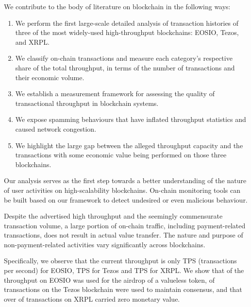 We contribute to the body of literature on blockchain in the following ways:  
\begin{enumerate}%
\item We perform the first large-scale detailed analysis of transaction histories of three of the most widely-used high-throughput blockchains: EOSIO, Tezos, and XRPL.

\item We classify on-chain transactions and measure each category's respective share of the total throughput, in terms of the number of transactions and their economic volume.

\item We establish a measurement framework for assessing the quality of transactional throughput in blockchain systems.

\item We expose spamming behaviours that have inflated throughput statistics and caused network congestion.

\item We highlight the large gap between the alleged throughput capacity and the transactions with some economic value being performed on those three blockchains.
\end{enumerate}
%
Our analysis serves as the first step towards a better understanding of the nature of user activities on high-scalability blockchains. On-chain monitoring tools can be built based on our framework to detect undesired or even malicious behaviour.

Despite the advertised high throughput and the seemingly commensurate transaction volume, a large portion of on-chain traffic, including payment-related transactions, does not result in actual value transfer. 
The nature and purpose of non-payment-related activities vary significantly across blockchains.

Specifically, we observe that the current throughput is only TPS (transactions per second) for EOSIO,  TPS for Tezos and  TPS for XRPL.
We show that  of the throughput on EOSIO was used for the airdrop of a valueless token,  of transactions on the Tezos blockchain were used to maintain consensus,
and that over  of transactions on XRPL carried zero monetary value.
